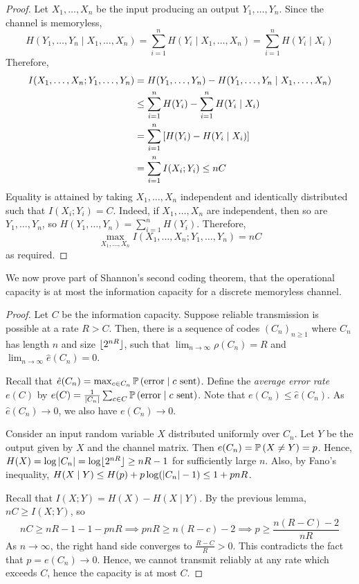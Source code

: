 \begin{proof}
    Let \( X_1, \dots, X_n \) be the input producing an output \( Y_1, \dots, Y_n \).
    Since the channel is memoryless,
    \[ H(Y_1, \dots, Y_n \mid X_1, \dots, X_n) = \sum_{i=1}^n H(Y_i \mid X_1, \dots, X_n) = \sum_{i=1}^n H(Y_i \mid X_i) \]
    Therefore,
    \begin{align*}
        I(X_1, \dots, X_n; Y_1, \dots, Y_n) &= H(Y_1, \dots, Y_n) - H(Y_1, \dots, Y_n \mid X_1, \dots, X_n) \\
        &\leq \sum_{i=1}^n H(Y_i) - \sum_{i=1}^n H(Y_i \mid X_i) \\ 
        &= \sum_{i=1}^n \qty[H(Y_i) - H(Y_i \mid X_i)] \\
        &= \sum_{i=1}^n I(X_i;Y_i) \leq nC
    \end{align*}
    Equality is attained by taking \( X_1, \dots, X_n \) independent and identically distributed such that \( I(X_i;Y_i) = C \).
    Indeed, if \( X_1, \dots, X_n \) are independent, then so are \( Y_1, \dots, Y_n \), so \( H(Y_1, \dots, Y_n) = \sum_{i=1}^n H(Y_i) \).
    Therefore,
    \[ \max_{X_1, \dots, X_n} I(X_1, \dots, X_n; Y_1, \dots, Y_n) = nC \]
    as required.
\end{proof}
We now prove part of Shannon's second coding theorem, that the operational capacity is at most the information capacity for a discrete memoryless channel.
\begin{proof}
    Let \( C \) be the information capacity.
    Suppose reliable transmission is possible at a rate \( R > C \).
    Then, there is a sequence of codes \( (C_n)_{n \geq 1} \) where \( C_n \) has length \( n \) and size \( \lfloor2^{nR}\rfloor \), such that \( \lim_{n \to \infty} \rho(C_n) = R \) and \( \lim_{n \to \infty} \hat e(C_n) = 0 \).

    Recall that \( \hat e(C_n) = \max_{c \in C_n} \mathbb{P}\left({\text{error} \mid c \text{ sent}}\right) \).
    Define the \emph{average error rate} \( e(C) \) by \( e(C) = \frac{1}{\abs{C_n}} \sum_{c \in C} \mathbb{P}\left({\text{error} \mid c \text{ sent}}\right) \).
    Note that \( e(C_n) \leq \hat e(C_n) \).
    As \( \hat e(C_n) \to 0 \), we also have \( e(C_n) \to 0 \).

    Consider an input random variable \( X \) distributed uniformly over \( C_n \).
    Let \( Y \) be the output given by \( X \) and the channel matrix.
    Then \( e(C_n) = \mathbb{P}\left({X \neq Y}\right) = p \).
    Hence, \( H(X) = \log \abs{C_n} = \log \lfloor2^{nR}\rfloor \geq nR - 1 \) for sufficiently large \( n \).
    Also, by Fano's inequality, \( H(X \mid Y) \leq H(p) + p \log(\abs{C_n} - 1) \leq 1 + pnR \).
    
    Recall that \( I(X;Y) = H(X) - H(X \mid Y) \).
    By the previous lemma, \( nC \geq I(X;Y) \), so
    \[ nC \geq nR - 1 - 1 - pnR \implies pnR \geq n(R - c) - 2 \implies p \geq \frac{n(R - C) - 2}{nR} \]
    As \( n \to \infty \), the right hand side converges to \( \frac{R - C}{R} > 0 \).
    This contradicts the fact that \( p = e(C_n) \to 0 \).
    Hence, we cannot transmit reliably at any rate which exceeds \( C \), hence the capacity is at most \( C \).
\end{proof}

